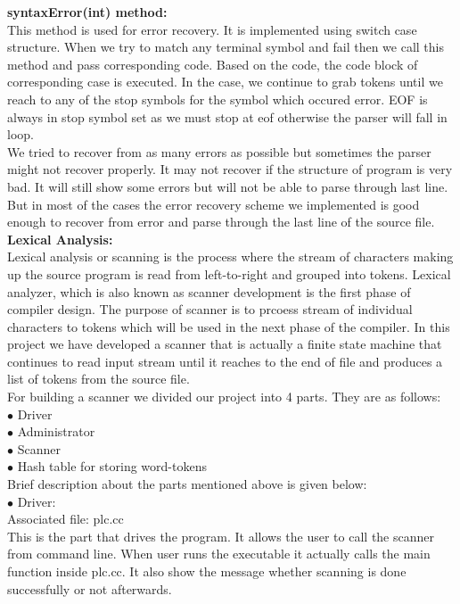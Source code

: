 \documentclass[paper=letter, fontsize=11pt]{scrartcl} %
\begin{document}
{\bf syntaxError(int) method:}\\
This method is used for error recovery. It is implemented using switch case structure. When we try to match any terminal symbol and fail then we call this method and pass corresponding code. Based on the code, the code block of corresponding case is executed. In the case, we continue to grab tokens until we reach to any of the stop symbols for the symbol which occured error. EOF is always in stop symbol set as we must stop at eof otherwise the parser will fall in loop.\\

We tried to recover from as many errors as possible but sometimes the parser might not recover properly. It may not recover if the structure of program is very bad. It will still show some errors but will not be able to parse through last line. But in most of the cases the error recovery scheme we implemented is good enough to recover from error and parse through the last line of the source file.\\

\pagebreak
{\bf {\huge Lexical Analysis:}}\\
Lexical analysis or scanning is the process where the stream of characters making up the source program is read from left-to-right and grouped into tokens. Lexical analyzer, which is also known as scanner development is the first phase of compiler design. The purpose of scanner is to prcoess stream of individual characters to tokens which will be used in the next phase of the compiler. In this project we have developed a scanner that is actually a finite state machine that continues to read input stream until it reaches to the end of file and produces a list of tokens from the source file.\\
For building a scanner we divided our project into 4 parts. They are as follows:\\
$\bullet$ Driver\\
$\bullet$ Administrator\\
$\bullet$ Scanner\\
$\bullet$ Hash table for storing word-tokens\\

Brief description about the parts mentioned above is given below:\\
$\bullet$ Driver:\\

Associated file: plc.cc\\
This is the part that drives the program. It allows the user to call the scanner from command line. When user runs the executable it actually calls the main function inside plc.cc. It also show the message whether scanning is done successfully or not afterwards.
\end{document}
